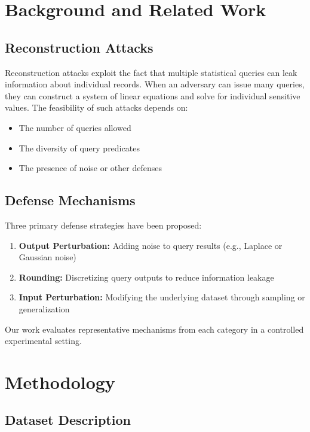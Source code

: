 \documentclass[11pt,letterpaper]{article}
\begin{document}
\section{Background and Related Work}

\subsection{Reconstruction Attacks}

Reconstruction attacks exploit the fact that multiple statistical queries can leak information about individual records. When an adversary can issue many queries, they can construct a system of linear equations and solve for individual sensitive values. The feasibility of such attacks depends on:

\begin{itemize}[leftmargin=*]
    \item The number of queries allowed
    \item The diversity of query predicates
    \item The presence of noise or other defenses
\end{itemize}

\subsection{Defense Mechanisms}

Three primary defense strategies have been proposed:

\begin{enumerate}[leftmargin=*]
    \item \textbf{Output Perturbation:} Adding noise to query results (e.g., Laplace or Gaussian noise)
    \item \textbf{Rounding:} Discretizing query outputs to reduce information leakage
    \item \textbf{Input Perturbation:} Modifying the underlying dataset through sampling or generalization
\end{enumerate}

Our work evaluates representative mechanisms from each category in a controlled experimental setting.

\section{Methodology}

\subsection{Dataset Description}
\end{document}
